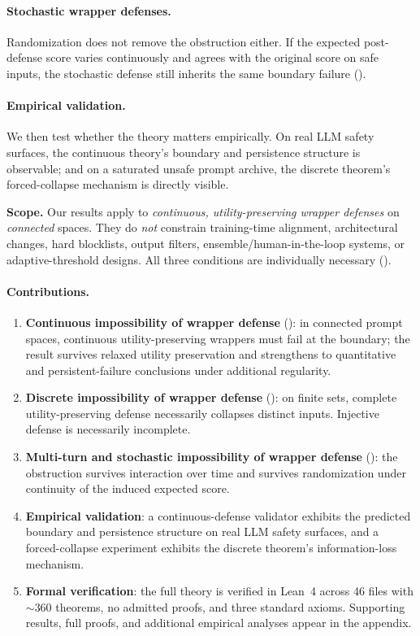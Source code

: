 \documentclass[11pt]{article}
\begin{document}
\paragraph{Stochastic wrapper defenses.}
Randomization does not remove the obstruction either. If the expected
post-defense score varies continuously and agrees with the original
score on safe inputs, the stochastic defense still inherits the same
boundary failure ().

\paragraph{Empirical validation.}
We then test whether the theory matters empirically. On real LLM safety
surfaces, the continuous theory's boundary and persistence structure is
observable; and on a saturated unsafe prompt archive, the discrete
theorem's forced-collapse mechanism is directly visible.

\medskip
\noindent\textbf{Scope.}
Our results apply to \emph{continuous, utility-preserving wrapper defenses} on \emph{connected} spaces. They do \emph{not} constrain training-time alignment, architectural changes, hard blocklists, output filters, ensemble/human-in-the-loop systems, or adaptive-threshold designs. All three conditions are individually necessary ().

\paragraph{Contributions.}
\begin{enumerate}[nosep]
  \item \textbf{Continuous impossibility of wrapper defense}
    ():
    in connected prompt spaces, continuous utility-preserving wrappers
    must fail at the boundary; the result survives relaxed utility
    preservation and strengthens to quantitative and persistent-failure
    conclusions under additional regularity.
  \item \textbf{Discrete impossibility of wrapper defense}
    (): on finite sets, complete
    utility-preserving defense necessarily collapses distinct inputs.
    Injective defense is necessarily incomplete.
  \item \textbf{Multi-turn and stochastic impossibility of wrapper defense}
    (): the obstruction survives
    interaction over time and survives randomization under continuity of
    the induced expected score.
  \item \textbf{Empirical validation}: a continuous-defense validator
    exhibits the predicted boundary and persistence structure on real
    LLM safety surfaces, and a forced-collapse experiment exhibits the
    discrete theorem's information-loss mechanism.
  \item \textbf{Formal verification}: the full theory is verified in
    Lean~4 across 46 files with ${\sim}360$ theorems, no admitted
    proofs, and three standard axioms. Supporting results, full proofs,
    and additional empirical analyses appear in the appendix.
\end{enumerate}
\end{document}
